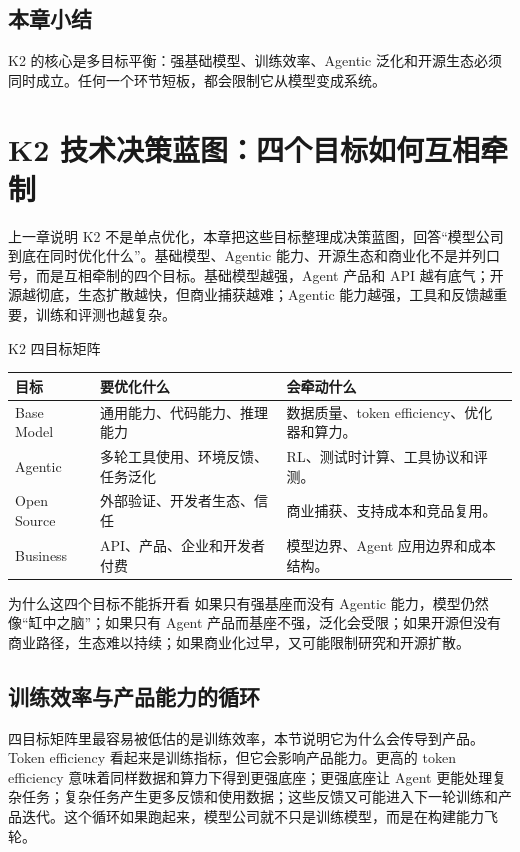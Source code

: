 \documentclass[a4paper]{article}
\begin{document}
\subsection{本章小结}

K2 的核心是多目标平衡：强基础模型、训练效率、Agentic 泛化和开源生态必须同时成立。任何一个环节短板，都会限制它从模型变成系统。

\section{K2 技术决策蓝图：四个目标如何互相牵制}

上一章说明 K2 不是单点优化，本章把这些目标整理成决策蓝图，回答“模型公司到底在同时优化什么”。基础模型、Agentic 能力、开源生态和商业化不是并列口号，而是互相牵制的四个目标。基础模型越强，Agent 产品和 API 越有底气；开源越彻底，生态扩散越快，但商业捕获越难；Agentic 能力越强，工具和反馈越重要，训练和评测也越复杂。

\begin{knowledgebox}{K2 四目标矩阵}
\begin{tabularx}{\textwidth}{p{}p{}p{}}
\toprule
目标 & 要优化什么 & 会牵动什么 \\
\midrule
Base Model & 通用能力、代码能力、推理能力 & 数据质量、token efficiency、优化器和算力。 \\
Agentic & 多轮工具使用、环境反馈、任务泛化 & RL、测试时计算、工具协议和评测。 \\
Open Source & 外部验证、开发者生态、信任 & 商业捕获、支持成本和竞品复用。 \\
Business & API、产品、企业和开发者付费 & 模型边界、Agent 应用边界和成本结构。 \\
\bottomrule
\end{tabularx}
\end{knowledgebox}

\begin{importantbox}{为什么这四个目标不能拆开看}
如果只有强基座而没有 Agentic 能力，模型仍然像“缸中之脑”；如果只有 Agent 产品而基座不强，泛化会受限；如果开源但没有商业路径，生态难以持续；如果商业化过早，又可能限制研究和开源扩散。
\end{importantbox}

\subsection{训练效率与产品能力的循环}

四目标矩阵里最容易被低估的是训练效率，本节说明它为什么会传导到产品。Token efficiency 看起来是训练指标，但它会影响产品能力。更高的 token efficiency 意味着同样数据和算力下得到更强底座；更强底座让 Agent 更能处理复杂任务；复杂任务产生更多反馈和使用数据；这些反馈又可能进入下一轮训练和产品迭代。这个循环如果跑起来，模型公司就不只是训练模型，而是在构建能力飞轮。
\end{document}
